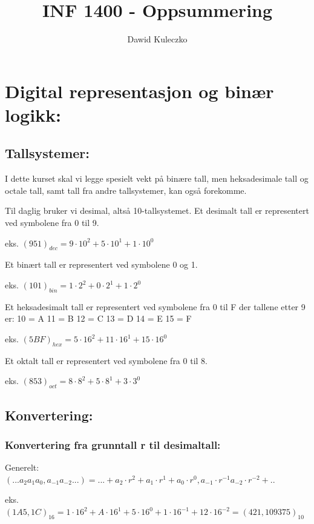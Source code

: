 \documentclass{article}
\begin{document}
	\title{INF 1400 - Oppsummering}
	\author{Dawid Kuleczko}
	\maketitle	
	\tableofcontents
	
	\section{Digital representasjon og binær logikk:}
	\subsection{Tallsystemer:}
	
	I dette kurset skal vi legge spesielt vekt på binære tall, men heksadesimale tall og octale tall, samt tall fra andre tallsystemer, kan også forekomme.
	
	Til daglig bruker vi desimal, altså 10-tallsystemet. Et desimalt tall er representert ved symbolene fra 0 til 9.
	
	eks. $(951)_{dec} = 9 \cdot 10^2 + 5 \cdot 10^1 + 1 \cdot 10^0$
	
	Et binært tall er representert ved symbolene 
	0 og 1.
	
	eks. $ (101)_{bin} = 1 \cdot 2^2 + 0 \cdot 2^1 + 1 \cdot 2^0$
	
	Et heksadesimalt tall er representert ved symbolene 
	fra 0 til F der tallene etter 9 er:
	10 = A
	11 = B
	12 = C
	13 = D
	14 = E
	15 = F
	
	eks. $(5BF)_{hex} = 5 \cdot 16^2 + 11 \cdot 16^1 + 15 \cdot 16^0$ 
	
	Et oktalt tall er representert ved symbolene fra 0 til 8.
	
	eks. $(853)_{oct} = 8 \cdot 8^2 + 5 \cdot 8^1 + 3 \cdot 3^0$

	\subsection{Konvertering:}
	
	\subsubsection{Konvertering fra grunntall r til desimaltall:}
	Generelt:
	$(...a_2 a_1 a_0 , a_{-1} a_{-2}...) = ... + a_2 \cdot r^2 + a_1 \cdot r^1 + a_0 \cdot r^0 , a_{-1} \cdot r^{-1} a_{-2} \cdot r^{-2} + ..$
	
	eks.
	$(1A5,1C)_{16} = 1 \cdot 16^2 + A \cdot 16^1 + 5 \cdot 16^0 + 1 \cdot 16^{-1} + 12 \cdot 16^{-2} = (421,109375)_{10}$
	
\end{document}
